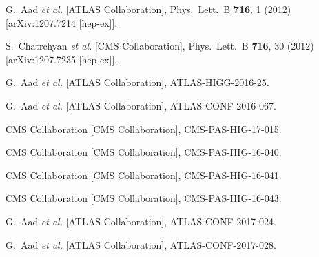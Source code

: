 \documentclass[10pt]{article}
\begin{document}
\begin{thebibliography}{99}


  G.~Aad {\it et al.}  [ATLAS Collaboration],
  Phys.\ Lett.\ B {\bf 716}, 1 (2012)
  [arXiv:1207.7214 [hep-ex]].
  
  
  S.~Chatrchyan {\it et al.}  [CMS Collaboration],
  Phys.\ Lett.\ B {\bf 716}, 30 (2012)
  [arXiv:1207.7235 [hep-ex]].


  G.~Aad {\it et al.}  [ATLAS Collaboration],
  ATLAS-HIGG-2016-25.


  G.~Aad {\it et al.}  [ATLAS Collaboration],
  ATLAS-CONF-2016-067.


  CMS Collaboration  [CMS Collaboration],
  CMS-PAS-HIG-17-015.


  CMS Collaboration  [CMS Collaboration],
  CMS-PAS-HIG-16-040.


  CMS Collaboration [CMS Collaboration],
  CMS-PAS-HIG-16-041.


  CMS Collaboration [CMS Collaboration],
  CMS-PAS-HIG-16-043.


  G.~Aad {\it et al.}  [ATLAS Collaboration],
  ATLAS-CONF-2017-024.


  G.~Aad {\it et al.}  [ATLAS Collaboration],
  ATLAS-CONF-2017-028.


\end{thebibliography}

 
\end{document}
